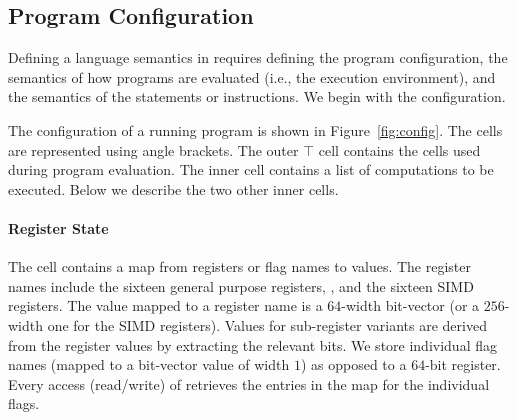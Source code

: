 


\subsection{Program Configuration}\label{sec:x86sema}



Defining a language semantics in \K requires defining the program configuration, the semantics of how programs are evaluated (i.e., the execution environment), and the semantics of the statements or instructions.  We begin with the configuration.

The \K configuration of a running \ISA program is shown in Figure~\ref{fig:config}. The cells are represented using angle brackets. The outer $\top$ cell contains the cells used during program evaluation. The inner  cell contains a list of computations to be executed. Below we describe the two other inner cells.

\paragraph{Register State}

The  cell contains a  map from registers or flag names to values. The register names include the sixteen general purpose registers, , and the sixteen SIMD registers.  The value mapped to a register name is a $64$-width bit-vector (or a $256$-width one for the SIMD registers). Values for sub-register variants are derived from the register values by extracting the relevant bits. We store individual flag names (mapped to a bit-vector value of width $1$) as opposed to a $64$-bit  register. Every access (read/write) of  retrieves the entries in the  map for the individual flags.

